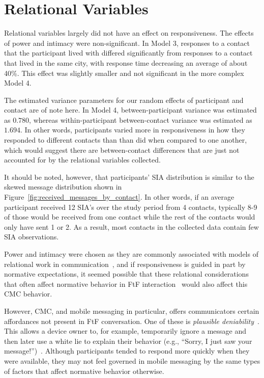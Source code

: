 \documentclass[12pt]{nuthesis}	%
\begin{document}
\section{Relational Variables}

Relational variables largely did not have an effect on responsiveness. The effects of power and intimacy were non-significant. In Model 3, responses to a contact that the participant lived with differed significantly from responses to a contact that lived in the same city, with response time decreasing an average of about 40\%. This effect was slightly smaller and not significant in the more complex Model 4.

The estimated variance parameters for our random effects of participant and contact are of note here. In Model 4, between-participant variance was estimated as $0.780$, whereas within-participant between-contact variance was estimated as $1.694$. In other words, participants varied more in responsiveness in how they responded to different contacts than than did when compared to one another, which would suggest there are between-contact differences that are just not accounted for by the relational variables collected.

It should be noted, however, that participants' SIA distribution is similar to the skewed message distribution shown in Figure~\ref{fig:received_messages_by_contact}. In other words, if an average participant received 12 SIA's over the study period from 4 contacts, typically 8-9 of those would be received from one contact while the rest of the contacts would only have sent 1 or 2. As a result, most contacts in the collected data contain few SIA observations.

Power and intimacy were chosen as they are commonly associated with models of relational work in communication~\citep{brown1987politeness,spencer2011conceptualising}, and if responsiveness is guided in part by normative expectations, it seemed possible that these relational considerations that often affect normative behavior in FtF interaction~\citep[e.g.,][]{guerrero1991waxing,henley1973power,leffler1982effects,sternglanz2004reading} would also affect this CMC behavior.

However, CMC, and mobile messaging in particular, offers communicators certain affordances not present in FtF conversation. One of these is \textit{plausible deniability}~\citep{lederer2004personal,nardi2000interaction}. This allows a device owner to, for example, temporarily ignore a message and then later use a white lie to explain their behavior (e.g., ``Sorry, I just saw your  message!'')~\citep{hancock2009butler}. Although participants tended to respond more quickly when they were available, they may not feel governed in mobile messaging by the same types of factors that affect normative behavior otherwise.
\end{document}
